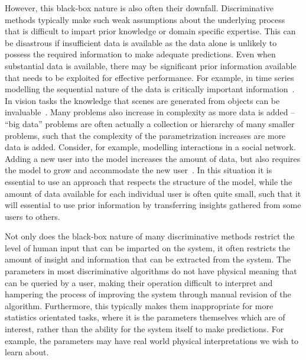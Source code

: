 However, this black-box nature is also often their downfall.  Discriminative methods typically make
such weak assumptions about the underlying process that is difficult to impart prior knowledge
or domain specific expertise.  This can be disastrous if insufficient data is available as the data
alone is unlikely to possess the required information to make adequate predictions.  Even when
substantial data is available, there may be significant prior information available that needs to be
exploited for effective performance.  For example, in time series modelling the sequential nature
of the data is critically important information~\citep{liu1998sequential}.  In vision tasks the 
knowledge that scenes are generated from objects can be invaluable~\citep{kulkarni2015picture}.
Many problems also increase in complexity as more data is added -- ``big data'' problems are often
actually a collection or hierarchy of many smaller problems, such that the complexity of the
parametrization increases are more data is added.  Consider, for example, modelling interactions in
a social network.  Adding a new user into the model increases the amount of data, but also
requires the model to grow and accommodate the new user~\citep{ravasz2003hierarchical}.  In
this situation it is essential to
use an approach that respects the structure of the model, while the amount of data available
for each individual user is often quite small, such that it will essential to use prior information
by transferring insights gathered from some users to others.

Not only does the black-box nature of many discriminative methods restrict the level of
human input that can be imparted on the system, it often restricts the amount of insight
and information that can be extracted from the system.  The parameters in most discriminative
algorithms do not have physical meaning that can be queried by a user, making their operation
difficult to interpret and hampering the process of improving the system through manual
revision of the algorithm.  Furthermore, this typically makes them inappropriate for more
statistics orientated tasks, where it is the parameters themselves which are of interest, rather
than the ability for the system itself to make predictions.  For example, the parameters may
have real world physical interpretations we wish to learn about.

